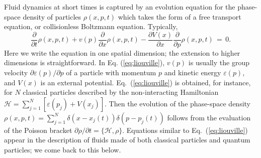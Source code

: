 \documentclass[onecolumn,amsfonts,showpacs,superscriptaddress]{revtex4-1}
\begin{document}
\vspace{0.5cm}




Fluid dynamics at short times is captured by an evolution equation for the phase-space density of particles $\rho(x,p,t)$ which takes the form of a free transport equation, or collisionless Boltzmann equation. Typically,
\begin{equation}
	\label{eq:liouville}
	\frac{\partial}{\partial t} \rho(x,p,t)  + v(p)  \frac{\partial}{\partial x} \rho(x,p,t) -   \frac{\partial  V(x)}{\partial x}  \frac{\partial}{\partial p} \rho(x,p,t)   \, = \, 0.
\end{equation}
Here we write the equation in one spatial dimension; the extension to higher dimensions is straightforward. In Eq. (\ref{eq:liouville}), $v(p)$ is usually the group velocity $ \partial \varepsilon(p)/\partial p$ of a particle with momentum $p$ and kinetic energy $\varepsilon(p)$, and $V(x)$ is an external potential. Eq.~(\ref{eq:liouville}) is obtained, for instance, for $N$ classical particles described by the non-interacting Hamiltonian $\mathcal{H} = \sum_{j=1}^N [ \varepsilon(p_j) + V(x_j) ]$. Then the evolution of the phase-space density $\rho(x,p,t) = \sum_{j=1}^N  \delta(x - x_j(t) ) \delta(p-p_j(t))$ follows from the evaluation of the Poisson bracket $\partial \rho / \partial t = \{ \mathcal{H}, \rho  \}$. Equations similar to Eq.~(\ref{eq:liouville}) appear in the description of fluids made of both classical particles and quantum particles; we come back to this below.

 
\vspace{0.5cm}
\end{document}

